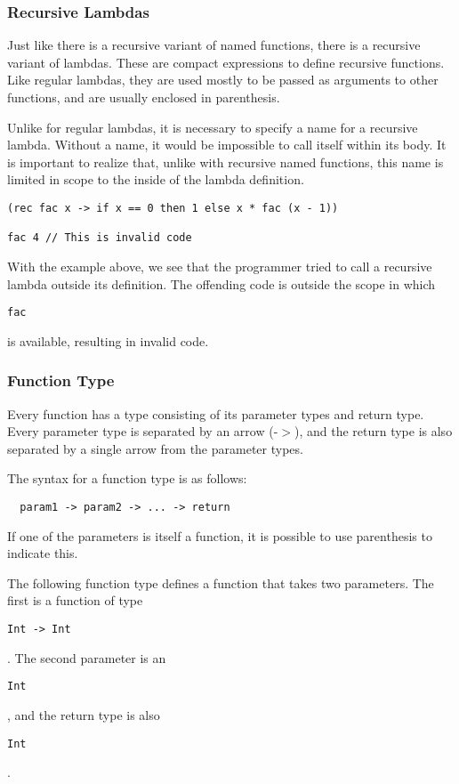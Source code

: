 \documentclass{article}
\def\code#1{\begin{footnotesize}\texttt{#1}\end{footnotesize}}
\begin{document}
\subsubsection{Recursive Lambdas}

Just like there is a recursive variant of named functions, there is a recursive variant of lambdas.
These are compact expressions to define recursive functions.
Like regular lambdas, they are used mostly to be passed as arguments to other functions, and are usually enclosed in parenthesis.

Unlike for regular lambdas, it is necessary to specify a name for a recursive lambda.
Without a name, it would be impossible to call itself within its body.
It is important to realize that, unlike with recursive named functions, this name is limited in scope to the inside of the lambda definition.

\begin{lstlisting}
(rec fac x -> if x == 0 then 1 else x * fac (x - 1))

fac 4 // This is invalid code
\end{lstlisting}

With the example above, we see that the programmer tried to call a recursive lambda outside its definition.
The offending code is outside the scope in which \code{fac} is available, resulting in invalid code.

\subsubsection{Function Type}\label{Function Type}

Every function has a type consisting of its parameter types and return type.
Every parameter type is separated by an arrow (-$>$), and the return type is also separated by a single arrow from the parameter types.

The syntax for a function type is as follows:
\begin{lstlisting}
  param1 -> param2 -> ... -> return
\end{lstlisting}

\smallskip

 If one of the parameters is itself a function, it is possible to use parenthesis to indicate this.

The following function type defines a function that takes two parameters.
The first is a function of type \code{Int -> Int}.
The second parameter is an \code{Int}, and the return type is also \code{Int}.
\end{document}
